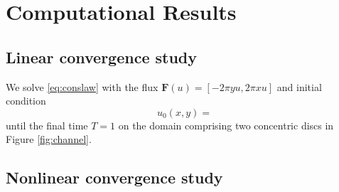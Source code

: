 \section{Computational Results}\label{compResults}

\subsection{Linear convergence study}
We solve \eqref{eq:conslaw} with the flux $\mathbf{F}(u) = [-2\pi y u, 2\pi x u]$ and initial condition
$$
u_0(x,y) = 
$$
until the final time $T = 1$ on the domain comprising two concentric discs in Figure \ref{fig:channel}.   
\subsection{Nonlinear convergence study}